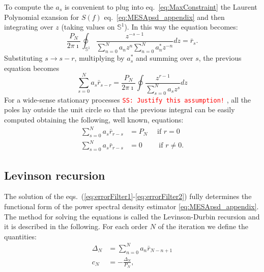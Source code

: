 \documentclass[twocolumn,showpacs,preprintnumbers,nofootinbib,prd,
superscriptaddress,10pt]{revtex4-1}
\newcommand{\sschmidt}[1]{{\textcolor{red}{\texttt{SS: #1}} }}
\begin{document}
To compute the $a_s$ is convenient to plug into eq.~\eqref{eq:MaxConstraint} the Laurent Polynomial exansion for $S(f)$ eq.~\eqref{eq:MESApsd_appendix} and then integrating over $z$ (taking values on ${\mathbb S^1}$). In this way the equation becomes:
\begin{equation}
    \label{eq:contourintegral}
   \frac{P_N}{2 \pi \imath} \oint _{\mathbb S^1}\frac{z^{-s - 1}}{\sum_{n = 0}^N a_n z^n \sum_{n = 0}^N a^*_n z^{-n}}dz = \bar r_s. 
\end{equation}
Substituting $s \to s - r$, multiplying by $a^*_s$ and summing over $s$, the previous equation becomes 
\begin{equation}
    \label{eq:errorFilter}
    \sum_{s = 0}^N a_s \bar r_{s - r} = \frac{P_N}{2 \pi \imath}\oint \frac{z^{r -1}}{\sum_{s = 0}^N a_s z^s}dz
\end{equation}
For a wide-sense stationary processes \sschmidt{Justify this assumption!}, all the poles lay outside the unit circle so that the previous integral can be easily computed obtaining the following, well known, equations: 
\begin{align}
    \label{eq:errorFilter1}
    \sum_{s = 0}^N a_s \bar r_{r - s} &= P_N \quad \text{ if } r = 0 \\ \label{eq:errorFilter2}
    \sum_{s = 0}^N a_s \bar r_{r - s} & = 0 \qquad \text{ if } r \neq 0.
\end{align}

\subsection{Levinson recursion} \label{sec:LevinsonRecursion}
The solution of the eqs.~(\ref{eq:errorFilter1}-\ref{eq:errorFilter2}) fully determines the functional form of the power spectral density estimator \eqref{eq:MESApsd_appendix}.
The method for solving the equations is called the Levinson-Durbin recursion \cite{doi:10.1002/sapm1946251261} and it is described in the following.
For each order $N$ of the iteration we define the quantities:
\begin{align}
\Delta_N &= \sum_{n = 0}^{N} a_n \bar{r}_{N - n + 1} \\ 
c_N &= - \frac{\Delta_N}{P_N},
\end{align}
\end{document}
